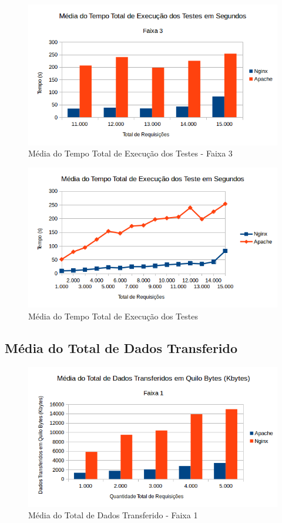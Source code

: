 \begin{figure}[H]
	\centering
	\includegraphics[width=1\linewidth]{graficos/grafico1-f3} 
	\caption{Média do Tempo Total de Execução dos Testes - Faixa 3}
	\label{fig:grafico1-f3}
\end{figure}

\begin{figure}[H]
	\centering
	\includegraphics[width=1\linewidth]{graficos/grafico1} 
	\caption{Média do Tempo Total de Execução dos Testes}
	\label{fig:grafico1}
\end{figure}


\subsection{Média do Total de Dados Transferido}
\begin{figure}[H]
	\centering
	\includegraphics[width=1\linewidth]{graficos/grafico2-f1} 
	\caption{Média do Total de Dados Transferido - Faixa 1}
	\label{fig:grafico2-f1}
\end{figure}

